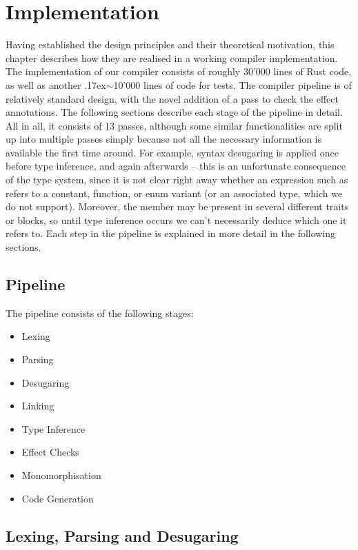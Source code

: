 \chapter{Implementation}\label{ch:implementation}

Having established the design principles and their theoretical motivation, this chapter describes how they are realised in a working compiler implementation. The implementation of our compiler consists of roughly 30'000 lines of Rust code, as well as another {\raise.17ex\hbox{$\scriptstyle\sim$}}10'000 lines of code for tests. The compiler pipeline is of relatively standard design, with the novel addition of a pass to check the effect annotations. The following sections describe each stage of the pipeline in detail. All in all, it consists of 13 passes, although some similar functionalities are split up into multiple passes simply because not all the necessary information is available the first time around. For example, syntax desugaring is applied once before type inference, and again afterwards -- this is an unfortunate consequence of the type system, since it is not clear right away whether an expression such as  refers to a constant, function, or enum variant (or an associated type, which we do not support). Moreover, the member may be present in several different traits or  blocks, so until type inference occurs we can't necessarily deduce which one it refers to. Each step in the pipeline is explained in more detail in the following sections.

\section{Pipeline}

The pipeline consists of the following stages:
\begin{itemize}
  \item Lexing
  \item Parsing
  \item Desugaring
  \item Linking
  \item Type Inference
  \item Effect Checks
  \item Monomorphisation
  \item Code Generation
\end{itemize}

\section{Lexing, Parsing and Desugaring}

